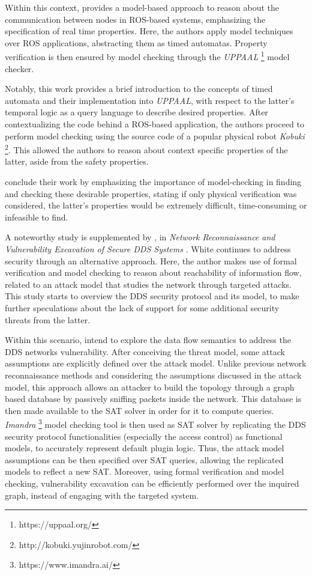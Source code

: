 Within this context, \citeauthor*{halder2017formal} provides a model-based approach to reason about the communication between nodes in ROS-based systems, emphasizing the specification of real time properties. Here, the authors apply model techniques over ROS applications, abstracting them as timed automatas. Property verification is then ensured by model checking through the \textit{UPPAAL} \footnote[3]{https://uppaal.org/} model checker. 

Notably, this work provides a brief introduction to the concepts of timed automata and their implementation into \textit{UPPAAL}, with respect to the latter's temporal logic as a query language to describe desired properties. After contextualizing the code behind a ROS-based application, the authors proceed to perform model checking using the source code of a popular physical robot \textit{Kobuki} \footnote[4]{http://kobuki.yujinrobot.com/}. This allowed the authors to reason about context specific properties of the latter, aside from the safety properties.

\citeauthor*{halder2017formal} conclude their work by emphasizing the importance of model-checking in finding and checking these desirable properties, stating if only physical verification was considered, the latter's properties would be extremely difficult, time-consuming or infeasible to find.

A noteworthy study is supplemented by \citeauthor*{white2019network}, in \textit{Network Reconnaissance and Vulnerability Excavation of Secure DDS Systems} \cite{white2019network}. White continues to address security \cite{white2016sros, white2018procedurally} through an alternative approach. Here, the author makes use of formal verification and model checking to reason about reachability of information flow, related to an attack model that studies the network through targeted attacks. This study starts to overview the DDS security protocol and its model, to make further speculations about the lack of support for some additional security threats from the latter. 

Within this scenario, \citeauthor{white2019network} intend to explore the data flow semantics to address the DDS networks vulnerability. After conceiving the threat model, some attack assumptions are explicitly defined over the attack model. Unlike previous network reconnaissance methods and considering the assumptions discussed in the attack model, this approach allows an attacker to build the topology through a graph based database by passively sniffing packets inside the network. This database is then made available to the SAT solver in order for it to compute queries. \textit{Imandra} \footnote[5]{https://www.imandra.ai/} model checking tool is then used as SAT solver by replicating the DDS security protocol functionalities (especially the access control) as functional models, to accurately represent default plugin logic. Thus, the attack model assumptions can be then specified over SAT queries, allowing the replicated models to reflect a new SAT. Moreover, using formal verification and model checking, vulnerability excavation can be efficiently performed over the inquired graph, instead of engaging with the targeted system. 

